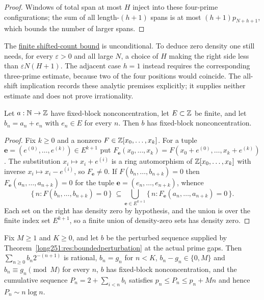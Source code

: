 \documentclass[11pt]{article}
\begin{document}
\begin{proof}
Windows of total span at most $H$ inject into these four-prime
configurations; the sum of all length-$(h+1)$ spans is at most
$(h+1)p_{N+h+1}$, which bounds the number of larger spans.
\end{proof}

The \href{https://github.com/wcook04/plectis-erdos/blob/d058b9150218ae23d2cfd975580088d6167e9da8/ErdosProblems/Erdos251/ShiftedGapCountingR9.lean#L152}{finite shifted-count bound} is unconditional.
To deduce zero density one still needs, for every $\varepsilon>0$ and all
large $N$, a choice of $H$ making the right side less than
$\varepsilon N(H+1)$. The adjacent case $h=1$ instead requires the
corresponding three-prime estimate, because two of the four positions would
coincide. The all-shift implication records these analytic premises explicitly;
it supplies neither estimate and does not prove irrationality.

\begin{theorem}\label{long251:res:nonconcentration}
Let $a:\mathbb{N}\to\mathbb{Z}$ have fixed-block nonconcentration, let $E\subset\mathbb{Z}$ be finite,
and let $b_n=a_n+e_n$ with $e_n\in E$ for every $n$.  Then $b$ has fixed-block
nonconcentration.
\end{theorem}

\begin{proof}
Fix $k\ge0$ and a nonzero $F\in\mathbb{Z}[x_0,\ldots,x_k]$.  For a tuple
$\mathbf e=(e^{(0)},\ldots,e^{(k)})\in E^{k+1}$ put
$F_{\mathbf e}(x_0,\ldots,x_k)=F(x_0+e^{(0)},\ldots,x_k+e^{(k)})$.  The
substitution $x_i\mapsto x_i+e^{(i)}$ is a ring automorphism of
$\mathbb{Z}[x_0,\ldots,x_k]$ with inverse $x_i\mapsto x_i-e^{(i)}$, so
$F_{\mathbf e}\ne0$.  If $F(b_n,\ldots,b_{n+k})=0$ then
$F_{\mathbf e}(a_n,\ldots,a_{n+k})=0$ for the tuple
$\mathbf e=(e_n,\ldots,e_{n+k})$, whence
\[
 \{\,n:F(b_n,\ldots,b_{n+k})=0\,\}
 \;\subseteq\!\!
 \bigcup_{\mathbf e\in E^{k+1}}\!\!
 \{\,n:F_{\mathbf e}(a_n,\ldots,a_{n+k})=0\,\}.
\]
Each set on the right has density zero by hypothesis, and the union is over
the finite index set $E^{k+1}$, so a finite union of density-zero sets has
density zero.
\end{proof}

\begin{corollary}\label{long251:res:nonconc-primes}
Fix $M\ge1$ and $K\ge0$, and let $b$ be the perturbed sequence supplied by
Theorem~\ref{long251:res:boundedperturbation} at the actual prime gaps.  Then
$\sum_{n\ge0}b_n2^{-(n+1)}$ is rational, $b_n=g_n$ for $n<K$,
$b_n-g_n\in\{0,M\}$ and $b_n\equiv g_n\pmod M$ for every $n$, $b$ has
fixed-block nonconcentration, and the cumulative sequence
$P_n=2+\sum_{i<n}b_i$ satisfies $p_n\le P_n\le p_n+Mn$ and hence
$P_n\sim n\log n$.
\end{corollary}
\end{document}
